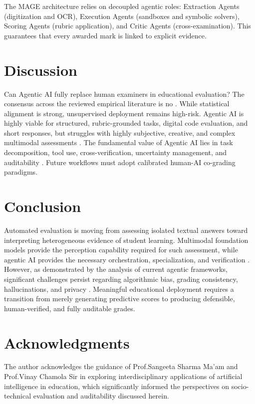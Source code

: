 \documentclass[11pt,a4paper]{article}
\begin{document}
The MAGE architecture relies on decoupled agentic roles: Extraction Agents (digitization and OCR), Execution Agents (sandboxes and symbolic solvers), Scoring Agents (rubric application), and Critic Agents (cross-examination). This guarantees that every awarded mark is linked to explicit evidence.

\section{Discussion}

Can Agentic AI fully replace human examiners in educational evaluation? The consensus across the reviewed empirical literature is no \cite{P011, P014}. While statistical alignment is strong, unsupervised deployment remains high-risk. Agentic AI is highly viable for structured, rubric-grounded tasks, digital code evaluation, and short responses, but struggles with highly subjective, creative, and complex multimodal assessments \cite{P016, P020, P024}. The fundamental value of Agentic AI lies in task decomposition, tool use, cross-verification, uncertainty management, and auditability \cite{P008, P012, P027}. Future workflows must adopt calibrated human-AI co-grading paradigms.

\section{Conclusion}

Automated evaluation is moving from assessing isolated textual answers toward interpreting heterogeneous evidence of student learning. Multimodal foundation models provide the perception capability required for such assessment, while agentic AI provides the necessary orchestration, specialization, and verification \cite{P008, P027}. However, as demonstrated by the analysis of current agentic frameworks, significant challenges persist regarding algorithmic bias, grading consistency, hallucinations, and privacy \cite{P013, P019, P028}. Meaningful educational deployment requires a transition from merely generating predictive scores to producing defensible, human-verified, and fully auditable grades.

\section*{Acknowledgments}

The author acknowledges the guidance of Prof.Sangeeta Sharma Ma'am and Prof.Vinay Chamola Sir in exploring interdisciplinary applications of artificial intelligence in education, which significantly informed the perspectives on socio-technical evaluation and auditability discussed herein.
\end{document}
